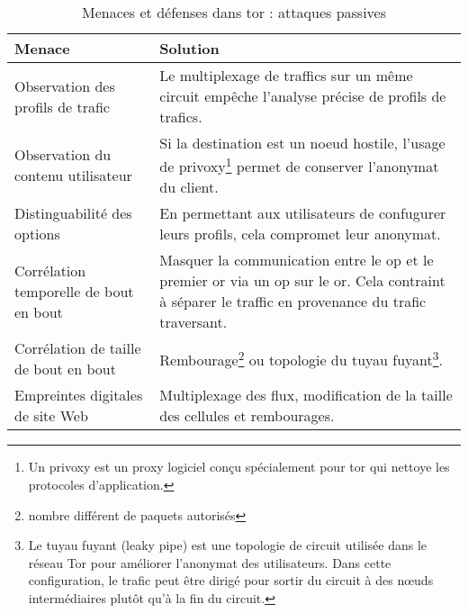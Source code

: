 \begin{table}[htpb]
    \centering
    \begin{tabularx}{\textwidth}{
        >{\raggedright\arraybackslash}X
        >{\raggedright\arraybackslash}X}
    \toprule
    \rowcolor[HTML]{EFEFEF}
    \textbf{Menace}                          & \textbf{Solution} \\ 
    \midrule
    Observation des profils de trafic         & Le multiplexage de traffics sur un même circuit empêche l'analyse précise de profils de trafics. \\
    \midrule
    Observation du contenu utilisateur       & Si la destination est un noeud hostile, l'usage de \gls{privoxy}\footnote{Un privoxy est un proxy logiciel conçu spécialement pour \acrshort{tor} qui nettoye les protocoles d'application.} permet de conserver l'anonymat du client. \\
    \midrule
    Distinguabilité des options               & En permettant aux utilisateurs de confugurer leurs profils, cela compromet leur anonymat. \\
    \midrule
    Corrélation temporelle de bout en bout   & Masquer la communication entre le \acrshort{op} et le premier \acrshort{or} via un \acrshort{op} sur le \acrshort{or}. Cela contraint à séparer le traffic en provenance du trafic traversant. \\
    \midrule
    Corrélation de taille de bout en bout    & Rembourage\footnote{nombre différent de paquets autorisés} ou topologie du tuyau fuyant\footnote{Le tuyau fuyant (leaky pipe) est une topologie de circuit utilisée dans le réseau Tor pour améliorer l'anonymat des utilisateurs. Dans cette configuration, le trafic peut être dirigé pour sortir du circuit à des nœuds intermédiaires plutôt qu'à la fin du circuit. }. \\
    \midrule
    Empreintes digitales de site Web         & Multiplexage des flux, modification de la taille des cellules et rembourages. \\
    \bottomrule
    \end{tabularx}
    \caption{Menaces et défenses dans \acrshort{tor} : attaques passives}
    \label{tab:ad-passive}
\end{table}